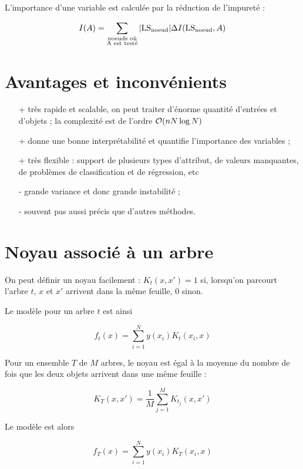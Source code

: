 	L'importance d'une variable est calculée par la réduction de l'impureté :
	
	$$I(A) = \sum_{\substack{\text{noeuds où} \\ \text{A est testé}}} \vert \text{LS}_{\text{noeud}} \vert \Delta I(\text{LS}_{\text{noeud}}, A)$$
	
	
	\section{Avantages et inconvénients}
	
	\begin{itemize}
		\item[+] très rapide et scalable, on peut traiter d'énorme quantité d'entrées et d'objets ; la complexité est de l'ordre $\mathcal{O} (nN\log N)$
		\item[+] donne une bonne interprétabilité et quantifie l'importance des variables ;
		\item[+] très flexible : support de plusieurs types d'attribut, de valeurs manquantes, de problèmes de classification et de régression, etc
		\item[-] grande variance et donc grande instabilité ;
		\item[-] souvent pas aussi précis que d'autres méthodes.
	\end{itemize}
	

	\section{Noyau associé à un arbre}
	
	On peut définir un noyau facilement : $K_t(x, x') = 1$ si, lorsqu'on parcourt l'arbre $t$, $x$ et $x'$ arrivent dans la même feuille, $0$ sinon.
	
	Le modèle pour un arbre $t$ est ainsi
	
	$$f_t(x) = \sum_{i = 1}^N y(x_i) K_t(x_i, x)$$
	
	Pour un ensemble $T$ de $M$ arbres, le noyau est égal à la moyenne du nombre de fois que les deux objets arrivent dans une même feuille :
	
	$$K_T(x, x') = \frac{1}{M} \sum_{j = 1}^M K_{t_j}(x, x')$$
	
	Le modèle est alors
	
	$$f_T(x) = \sum_{i = 1}^N y(x_i) K_T(x_i, x)$$